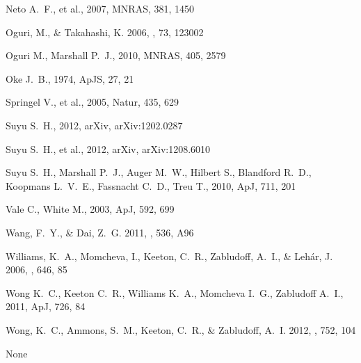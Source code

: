 \begin{thebibliography}{99}
Neto A.~F., et al., 2007, MNRAS, 381, 1450 


{Oguri}, M., \& {Takahashi}, K. 2006, \prd, 73, 123002

 Oguri M., Marshall P.~J., 2010, MNRAS, 405, 2579 


 Oke 
J.~B., 1974, ApJS, 27, 21 


 Springel V., et al., 2005, Natur, 435, 629 


 Suyu 
S.~H., 2012, arXiv, arXiv:1202.0287 


Suyu S.~H., et al., 2012, arXiv, arXiv:1208.6010 


Suyu S.~H., Marshall P.~J., Auger M.~W., Hilbert S., Blandford R.~D., 
Koopmans L.~V.~E., Fassnacht C.~D., Treu T., 2010, ApJ, 711, 201 


 Vale C., White M., 2003, ApJ, 592, 699 


{Wang}, F.~Y., \& {Dai}, Z.~G. 2011, \aap, 536, A96


{Williams}, K.~A., {Momcheva}, I., {Keeton}, C.~R., {Zabludoff}, A.~I., \&
  {Leh{\'a}r}, J. 2006, \apj, 646, 85

Wong K.~C., Keeton C.~R., Williams K.~A., Momcheva I.~G., Zabludoff A.~I., 
2011, ApJ, 726, 84 


{Wong}, K.~C., {Ammons}, S.~M., {Keeton}, C.~R., \& {Zabludoff}, A.~I. 2012,
  \apj, 752, 104




None

\end{thebibliography}
